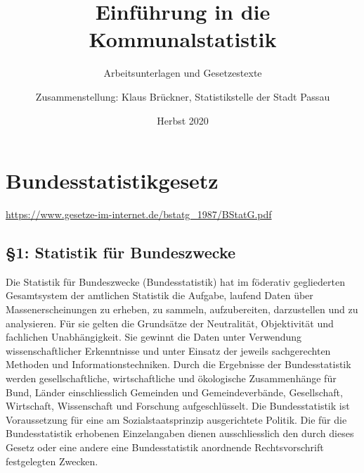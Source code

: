 \documentclass[A4, 12pt]{scrbook}
\title{Einführung in die Kommunalstatistik}
\subtitle{Arbeitsunterlagen und Gesetzestexte}
\author{Zusammenstellung: Klaus Brückner, Statistikstelle der Stadt Passau}
\date{Herbst 2020}
\begin{document}
\maketitle
\tableofcontents



\chapter[BStatG]{Bundesstatistikgesetz}
\newline
\url{https://www.gesetze-im-internet.de/bstatg_1987/BStatG.pdf}
    \section{\S 1: Statistik für Bundeszwecke} 
    Die Statistik für Bundeszwecke (Bundesstatistik) hat im föderativ gegliederten Gesamtsystem der amtlichen Statistik die Aufgabe, laufend Daten über Massenerscheinungen zu erheben, zu sammeln, aufzubereiten, darzustellen und zu analysieren. Für sie gelten die Grundsätze der Neutralität, Objektivität und fachlichen Unabhängigkeit. Sie gewinnt die Daten unter Verwendung wissenschaftlicher Erkenntnisse und unter Einsatz der jeweils sachgerechten Methoden und Informationstechniken. Durch die Ergebnisse der Bundesstatistik werden gesellschaftliche, wirtschaftliche und ökologische Zusammenhänge für Bund, Länder einschliesslich Gemeinden und Gemeindeverbände, Gesellschaft, Wirtschaft, Wissenschaft und Forschung aufgeschlüsselt. Die Bundesstatistik ist Voraussetzung für eine am Sozialstaatsprinzip ausgerichtete Politik. Die für die Bundesstatistik erhobenen Einzelangaben dienen ausschliesslich den durch dieses Gesetz oder eine andere eine Bundesstatistik anordnende Rechtsvorschrift festgelegten Zwecken.
\end{document}
